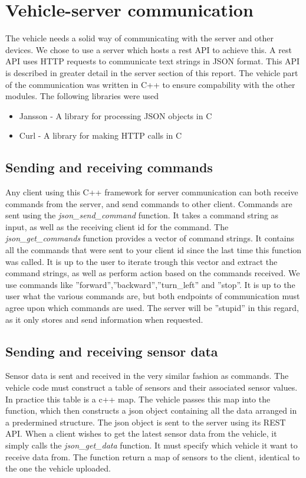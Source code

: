 \section{Vehicle-server communication}
The vehicle needs a solid way of communicating with the server and other devices. We chose to use a server which hosts a rest API to achieve this. A rest API uses HTTP requests to communicate text strings in JSON format. This API is described in greater detail in the server section of this report. The vehicle part of the communication was written in C++ to ensure compability with the other modules. The following libraries were used
\begin{itemize}
    \item Jansson - A library for processing JSON objects in C
    \item Curl - A library for making HTTP calls in C
\end{itemize}

\subsection{Sending and receiving commands}
Any client using this C++ framework for server communication can both receive commands from the server, and send commands to other client.
Commands are sent using the \textit{json_send_command} function. It takes a command string as input, as well as the receiving client id for the command.
The \textit{json_get_commands} function provides a vector of command strings. It contains all the commands that were sent to your client id since the last time this function was called. 
It is up to the user to iterate trough this vector and extract the command strings, as well as perform action based on the commands received. 
We use commands like ''forward'',''backward'',''turn_left'' and ''stop''. It is up to the user what the various commands are, but both endpoints of communication must agree upon which commands are used. The server will be ''stupid'' in this regard, as it only stores and send information when requested.

\subsection{Sending and receiving sensor data}
Sensor data is sent and received in the very similar fashion as commands.
The vehicle code must construct a table of sensors and their associated sensor values. 
In practice this table is a c++ map. 
The vehicle passes this map into the  function, which then constructs a json object containing all the data arranged in a predermined structure. 
The json object is sent to the server using its REST API.
When a client wishes to get the latest sensor data from the vehicle, it simply calls the \textit{json_get_data} function. It must specify which vehicle it want to receive data from. The function return a map of sensors to the client, identical to the one the vehicle uploaded.


